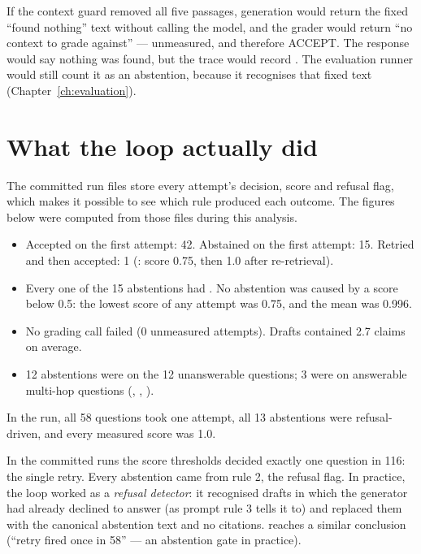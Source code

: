 \begin{inferred}
If the context guard removed all five passages, generation would return the fixed \enquote{found nothing} text without calling the model, and the grader would return \enquote{no context to grade against} --- unmeasured, and therefore ACCEPT. The response would say nothing was found, but the trace would record . The evaluation runner would still count it as an abstention, because it recognises that fixed text (Chapter~\ref{ch:evaluation}).
\end{inferred}

\section{What the loop actually did}
\label{sec:loop-evidence}

The committed run files store every attempt's decision, score and refusal flag, which makes it possible to see which rule produced each outcome. The figures below were computed from those files during this analysis.

\begin{verified}
\begin{itemize}
  \item Accepted on the first attempt: 42. Abstained on the first attempt: 15. Retried and then accepted: 1 (: score 0.75, then 1.0 after re-retrieval).
  \item Every one of the 15 abstentions had . No abstention was caused by a score below 0.5: the lowest score of any attempt was 0.75, and the mean was 0.996.
  \item No grading call failed (0 unmeasured attempts). Drafts contained 2.7 claims on average.
  \item 12 abstentions were on the 12 unanswerable questions; 3 were on answerable multi-hop questions (, , ).
\end{itemize}
In the  run, all 58 questions took one attempt, all 13 abstentions were refusal-driven, and every measured score was 1.0.
\end{verified}

\begin{keyidea}
In the committed runs the score thresholds decided exactly one question in 116: the single retry. Every abstention came from rule 2, the refusal flag. In practice, the loop worked as a \emph{refusal detector}: it recognised drafts in which the generator had already declined to answer (as prompt rule 3 tells it to) and replaced them with the canonical abstention text and no citations.  reaches a similar conclusion (\enquote{retry fired once in 58} --- an abstention gate in practice).
\end{keyidea}

